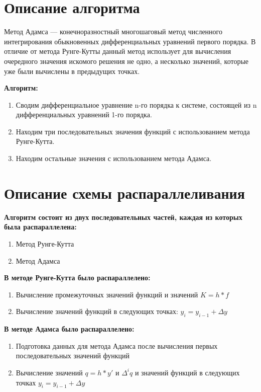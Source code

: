 \documentclass{report}
\begin{document}
\section*{Описание алгоритма}
\par Метод Адамса — конечноразностный многошаговый метод численного интегрирования обыкновенных дифференциальных уравнений первого порядка. В отличие от метода Рунге-Кутты данный метод использует для вычисления очередного значения искомого решения не одно, а несколько значений, которые уже были вычислены в предыдущих точках.

\par \textbf{Алгоритм:}

\begin{enumerate}
    \item Сводим дифференциальное уравнение n-го порядка к системе, состоящей из n дифференциальных уравнений 1-го порядка.
    \item Находим три последовательных значения функций с использованием метода Рунге-Кутта.
    \item Находим остальные значения с использованием метода Адамса.
\end{enumerate}

\newpage

\section* {Описание схемы распараллеливания}
\par \textbf{Алгоритм состоит из двух последовательных частей, каждая из которых была распараллелена:}
\begin{enumerate}
    \item Метод Рунге-Кутта
    \item Метод Адамса
\end{enumerate}
\vspace{2em}
\par \textbf{В методе Рунге-Кутта было распараллелено:}
\begin{enumerate}
    \item Вычисление промежуточных значений функций и значений ${K=h*f}$
    \item Вычисление значений функций в следующих точках: ${y_i = y_{i-1} + \Delta y}$
\end{enumerate}
\vspace{1em}
\par \textbf{В методе Адамса было распараллелено:}
\begin{enumerate}
    \item Подготовка данных для метода Адамса после вычисления первых последовательных значений функций
    \item Вычисление значений ${q=h*y'}$ и ${\Delta^i q}$ и значений функций в следующих точках ${y_i = y_{i-1} + \Delta y}$
\end{enumerate}
\end{document}
